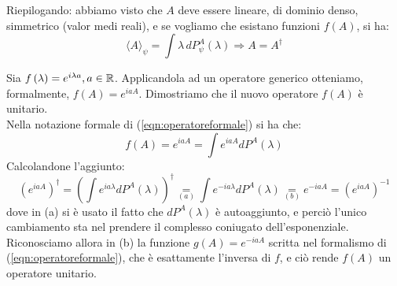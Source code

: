 \documentclass[../../FisicaTeorica.tex]{subfiles}
\begin{document}
Riepilogando: abbiamo visto che $A$ deve essere lineare, di dominio denso, simmetrico (valor medi reali), e se vogliamo che esistano funzioni $f(A)$, si ha:
\begin{equation}
    \langle A \rangle_\psi = \int \lambda \, dP_\psi^A(\lambda) \Rightarrow A=A^\dag
    \label{eqn:autoadjoint}
\end{equation}
\begin{oss}
Sia $f\left(\lambda\right)=e^{i\lambda a}, a\in \mathbb{R}$. Applicandola ad un operatore generico otteniamo, formalmente, $f(A) = e^{iaA}$. Dimostriamo che il nuovo operatore $f(A)$ è unitario.\\ Nella notazione formale di (\ref{eqn:operatoreformale}) si ha che:
\[
f(A) = e^{iaA} = \int e^{iaA} dP^A(\lambda)
\]
Calcolandone l'aggiunto:
\begin{equation}
\left(e^{iaA}\right)^\dag=\left(\int e^{ia\lambda}dP^A\left(\lambda\right)\right)^\dag
\underset{(a)}{=}\int e^{-ia\lambda}dP^A\left(\lambda\right)\underset{(b)}{=}e^{-iaA}=\left(e^{iaA}\right)^{-1}
\label{eqn:esponenzialeunitario}
\end{equation}
dove in (a) si è usato il fatto che $dP^A(\lambda)$ è autoaggiunto, e perciò l'unico cambiamento sta nel prendere il complesso coniugato dell'esponenziale. Riconosciamo allora in (b) la funzione $g(A) = e^{-iaA}$ scritta nel formalismo di (\ref{eqn:operatoreformale}), che è esattamente l'inversa di $f$, e ciò rende $f(A)$ un operatore unitario.
\label{dim:esponenzialeunitario}
\end{oss}
\end{document}
